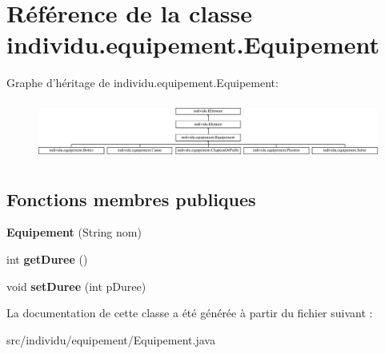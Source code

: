 \hypertarget{classindividu_1_1equipement_1_1_equipement}{\section{Référence de la classe individu.\-equipement.\-Equipement}
\label{classindividu_1_1equipement_1_1_equipement}
}
Graphe d'héritage de individu.\-equipement.\-Equipement\-:\begin{figure}[H]
\begin{center}
\leavevmode
\includegraphics[height=1.922747cm]{classindividu_1_1equipement_1_1_equipement}
\end{center}
\end{figure}
\subsection*{Fonctions membres publiques}
\begin{DoxyCompactItemize}
\item 
\hypertarget{classindividu_1_1equipement_1_1_equipement_ab3495255f9c6ae3e41e93c1aae3cf45d}{{\bfseries Equipement} (String nom)}\label{classindividu_1_1equipement_1_1_equipement_ab3495255f9c6ae3e41e93c1aae3cf45d}

\item 
\hypertarget{classindividu_1_1equipement_1_1_equipement_a801846813aa092406eaeb40ec265820e}{int {\bfseries get\-Duree} ()}\label{classindividu_1_1equipement_1_1_equipement_a801846813aa092406eaeb40ec265820e}

\item 
\hypertarget{classindividu_1_1equipement_1_1_equipement_a666480fb37b0e76e607868ebf3b8d6c2}{void {\bfseries set\-Duree} (int p\-Duree)}\label{classindividu_1_1equipement_1_1_equipement_a666480fb37b0e76e607868ebf3b8d6c2}

\end{DoxyCompactItemize}


La documentation de cette classe a été générée à partir du fichier suivant \-:\begin{DoxyCompactItemize}
\item 
src/individu/equipement/Equipement.\-java\end{DoxyCompactItemize}
